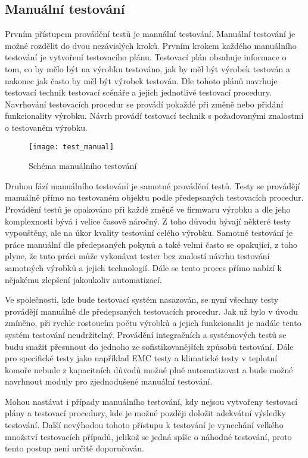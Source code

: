 \subsection{Manuální testování}
Prvním přístupem provádění testů je manuální testování. Manuální testování je možné rozdělit do dvou nezávislých kroků. Prvním krokem každého manuálního testování je vytvoření testovacího plánu. Testovací plán obsahuje informace o tom, co by mělo být na výrobku testováno, jak by měl být výrobek testován a nakonec jak často by měl být výrobek testován. Dle tohoto plánů navrhuje testovací technik testovací scénáře a jejich jednotlivé testovací procedury. Navrhování testovacích procedur se provádí pokaždé při změně nebo přidání funkcionality výrobku. Návrh provádí testovací technik s požadovanými znalostmi o testovaném výrobku.

\begin{figure}[h]
  \centering
  \texttt{[image: test\_manual]}
  \caption{Schéma manuálního testování}
  \label{fig:test_manual}
\end{figure}

Druhou fází manuálního testování je samotné provádění testů. Testy se provádějí manuálně přímo na testovaném objektu podle předepsaných testovacích procedur. Provádění testů je opakováno při každé změně ve firmwaru výrobku a dle jeho komplexnosti bývá i velice časově náročný. Z toho důvodu bývají některé testy vypouštěny, ale na úkor kvality testování celého výrobku. Samotné testování je práce manuální dle předepsaných pokynů a také velmi často se opakující, z toho plyne, že tuto práci může vykonávat tester bez znalostí návrhu testování samotných výrobků a jejich technologií. Dále se tento proces přímo nabízí k nějakému zlepšení jakoukoliv automatizací.

Ve společnosti, kde bude testovací systém nasazován, se nyní všechny testy provádějí manuálně dle předepsaných testovacích procedur. Jak už bylo v úvodu zmíněno, při rychle rostoucím počtu výrobků a jejich funkcionalit je nadále tento systém testování neudržitelný. Provádění integračních a systémových testů se budu snažit přesunout do jednoho ze sofistikovanějších způsobů testování. Dále pro specifické testy jako například EMC testy a klimatické testy v teplotní komoře nebude z kapacitních důvodů možné plně automatizovat a bude možné navrhnout moduly pro zjednodušené manuální testování.

Mohou nastávat i případy manuálního testování, kdy nejsou vytvořeny testovací plány a testovací procedury, kde je možné později doložit adekvátní výsledky testování. Další nevýhodou tohoto přístupu k testování je vynechání velkého množství testovacích případů, jelikož se jedná spíše o náhodné testování, proto tento postup není určitě doporučován.

